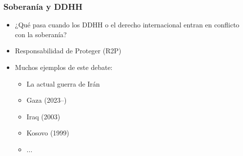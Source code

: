 




\begin{frame}
\frametitle{Soberanía y DDHH}
\centering

\begin{itemize}
  \item ¿Qué pasa cuando los DDHH o el derecho internacional entran en conflicto con la soberanía?
  \item Responsabilidad de Proteger (R2P)
  \item Muchos ejemplos de este debate:
  \begin{itemize}
      \item La actual guerra de Irán
      \item Gaza (2023--)
      \item Iraq (2003)
      \item Kosovo (1999)
      \item ...
  \end{itemize}
\end{itemize}

\end{frame}
\note{}

